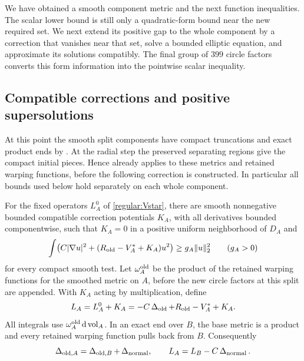 We have obtained a smooth component metric and the next function
inequalities. The scalar lower bound is still only a quadratic-form
bound near the new required set. We next extend its positive gap to
the whole component by a correction that vanishes near that set, solve a
bounded elliptic equation, and approximate its solutions compatibly.
The final group of $399$ circle factors converts this form information
into the pointwise scalar inequality.

\subsection{Compatible corrections and positive supersolutions}

At this point the smooth split components have compact truncations and
exact product ends by .  At the radial step the
preserved separating regions give the compact initial pieces.  Hence
 already applies to these metrics and retained
warping functions, before the following correction is constructed.  In particular
all bounds used below hold separately on each whole component.

\begin{lemma}\label{regular:correction}
For the fixed operators $L_A^0$ of \eqref{regular:Vstar}, there are
smooth nonnegative bounded compatible correction potentials $K_A$,
with all derivatives bounded componentwise, such that $K_A=0$ in a
positive uniform neighborhood of $D_A$ and
\begin{equation}\label{regular:global-gap}
 \int\bigl(C|\nabla u|^2+
       (R_{\rm old}-V_A^*+K_A)u^2\bigr)
 \ge g_A\|u\|_2^2\qquad(g_A>0)
\end{equation}
for every compact smooth test.
Let $\omega_A^{\rm old}$ be the product of the retained warping
functions for the smoothed metric on $A$, before the new circle
factors at this split are appended.  With $K_A$ acting by
multiplication, define
\[
 L_A=L_A^0+K_A
     =-C\operatorname{\Delta}_{\rm old}+R_{\rm old}-V_A^*+K_A.
\]
All integrals use $\omega_A^{\rm old}\,\mathrm d\operatorname{vol}_A$.
In an exact end over $B$, the base metric is a product and every
retained warping function pulls back from $B$.  Consequently
\[
 \operatorname{\Delta}_{{\rm old},A}=\operatorname{\Delta}_{{\rm old},B}+\operatorname{\Delta}_{\rm normal},
 \qquad L_A=L_B-C\operatorname{\Delta}_{\rm normal}.
\]
\end{lemma}

